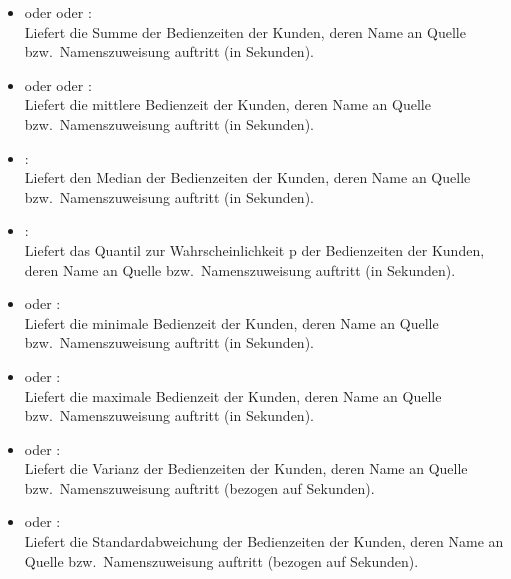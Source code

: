 \begin{itemize}

\item
{} oder  oder :\\
Liefert die Summe der Bedienzeiten der Kunden, deren Name an Quelle bzw.\ Namenszuweisung  auftritt (in Sekunden).

\item
{} oder  oder :\\
Liefert die mittlere Bedienzeit der Kunden, deren Name an Quelle bzw.\ Namenszuweisung  auftritt (in Sekunden).

\item
{}:\\
Liefert den Median der Bedienzeiten der Kunden, deren Name an Quelle bzw.\ Namenszuweisung  auftritt (in Sekunden).

\item
{}:\\
Liefert das Quantil zur Wahrscheinlichkeit p der Bedienzeiten der Kunden, deren Name an Quelle bzw.\ Namenszuweisung  auftritt (in Sekunden).

\item
{} oder :\\
Liefert die minimale Bedienzeit der Kunden, deren Name an Quelle bzw.\ Namenszuweisung  auftritt (in Sekunden).

\item
{} oder :\\
Liefert die maximale Bedienzeit der Kunden, deren Name an Quelle bzw.\ Namenszuweisung  auftritt (in Sekunden).

\item
{} oder :\\
Liefert die Varianz der Bedienzeiten der Kunden, deren Name an Quelle bzw.\ Namenszuweisung  auftritt (bezogen auf Sekunden).

\item
{} oder :\\
Liefert die Standardabweichung der Bedienzeiten der Kunden, deren Name an Quelle bzw.\ Namenszuweisung  auftritt (bezogen auf Sekunden).


\end{itemize}
